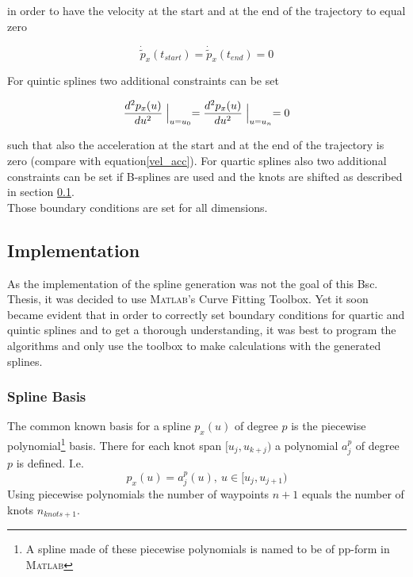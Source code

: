 in order to have the velocity at the start and at the end of the trajectory to equal zero

\begin{equation*}
\dot{\tilde{p}}_x(t_{start}) = \dot{\tilde{p}}_x(t_{end})=0
\end{equation*}

For quintic splines two additional constraints can be set

\begin{equation*}
\frac{d^2p_x(u)}{du^2} \Bigm|_{u=u_0} = \frac{d^2p_x(u)}{du^2} \Bigm|_{u=u_n}=0
\end{equation*}

such that also the acceleration at the start and at the end of the trajectory is zero (compare with equation\eqref{vel_acc}). For quartic splines also two additional constraints can be set if B-splines are used and the knots are shifted as described in section \ref{subsec:implementation}. \\
Those boundary conditions are set for all dimensions.



\subsection{Implementation}
\label{subsec:implementation}
As the implementation of the spline generation was not the goal of this Bsc. Thesis, it was decided to use \textsc{Matlab}'s Curve Fitting Toolbox. Yet it soon became evident that in order to correctly set boundary conditions for quartic and quintic splines and to get a thorough understanding, it was best to program the algorithms and only use the toolbox to make calculations with the generated splines.\\

\subsubsection{Spline Basis}
The common known basis for a spline $p_x(u)$ of degree $p$ is the piecewise polynomial\footnote{A spline made of these piecewise polynomials is named to be of pp-form in \textsc{Matlab}} basis. There for each knot span $[u_j, u_{k+j})$ a polynomial $a_j^p$ of degree $p$ is defined. I.e. 
\begin{equation}
p_x(u)=a_j^p(u),~u \in [u_j,u_{j+1})
\end{equation}
Using piecewise polynomials the number of waypoints $n+1$ equals the number of knots $n_{knots+1}$.



